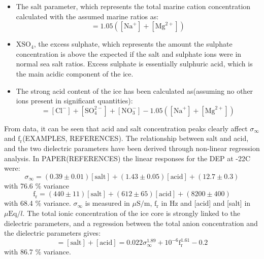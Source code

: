 \documentclass[../../CompleteThesis/Complete_1stDraft.tex]{subfiles}
\begin{document}
\begin{itemize}
	\item The salt parameter, which represents the total marine cation concentration calculated with the assumed marine ratios as:
	\begin{equation}
		[\text{salt}] = 1.05 ([\text{Na}^+] + [\text{Mg}^{2+}])
	\end{equation}
	\item $\text{XSO}_4$, the excess sulphate, which represents the amount the sulphate concentration is above the expected if the salt and sulphate ions were in normal sea salt ratios. Excess sulphate is essentially sulphuric acid, which is the main acidic component of the ice.
	\item The strong acid content of the ice has been calculated as(assuming no other ions present in significant quantities):
	\begin{equation}
		[\text{acid}] = [\text{Cl}^-] + [\text{SO}_4^{2-}] + [\text{NO}_3^-] - 1.05 ([\text{Na}^+] + [\text{Mg}^{2+}])
	\end{equation}
\end{itemize}

From data, it can be seen that acid and salt concentration peaks clearly affect $\sigma_{\infty}$ and $\text{f}_{\text{r}}$(EXAMPLES, REFERENCES). The relationship between salt and acid, and the two dielectric parameters have been derived through non-linear regression analysis. In PAPER(REFERENCES) the linear responses for the DEP at -22\degree C were:
\begin{equation}
	\sigma_{\infty} = (0.39\pm 0.01)[\text{salt}] + (1.43\pm 0.05)[\text{acid}] + (12.7\pm 0.3)
\end{equation}
with 76.6 \% variance
\begin{equation}
	\text{f}_{\text{r}} = (440\pm 11)[\text{salt}] + (612\pm 65)[\text{acid}] + (8200\pm 400)
\end{equation}
with 68.4 \% variance. $\sigma_{\infty}$ is measured in $\mu\text{S}/\text{m}$, $\text{f}_{\text{r}}$ in Hz and [acid] and [salt] in $\mu\text{Eq}/l$.
The total ionic concentration of the ice core is strongly linked to the dielectric parameters, and a regression between the total anion concentration and the dielectric parameters gives:
\begin{equation}
	[\text{anions}] = [\text{salt}] + [\text{acid}] = 0.022\sigma_{\infty}^{1.89} + 10^{-6}\text{f}_{\text{r}}^{1.61} - 0.2
\end{equation}
with 86.7 \% variance.
\end{document}
